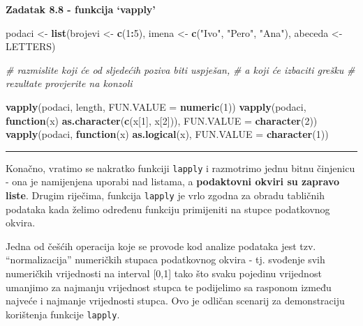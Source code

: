 \documentclass[]{book}
\newenvironment{Shaded}{\begin{snugshade}}{\end{snugshade}}
\newcommand{\KeywordTok}[1]{\textcolor[rgb]{0.13,0.29,0.53}{\textbf{#1}}}
\newcommand{\DataTypeTok}[1]{\textcolor[rgb]{0.13,0.29,0.53}{#1}}
\newcommand{\DecValTok}[1]{\textcolor[rgb]{0.00,0.00,0.81}{#1}}
\newcommand{\StringTok}[1]{\textcolor[rgb]{0.31,0.60,0.02}{#1}}
\newcommand{\CommentTok}[1]{\textcolor[rgb]{0.56,0.35,0.01}{\textit{#1}}}
\newcommand{\ControlFlowTok}[1]{\textcolor[rgb]{0.13,0.29,0.53}{\textbf{#1}}}
\newcommand{\OperatorTok}[1]{\textcolor[rgb]{0.81,0.36,0.00}{\textbf{#1}}}
\newcommand{\NormalTok}[1]{#1}
\theoremstyle{definition}
\theoremstyle{definition}
\theoremstyle{definition}
\theoremstyle{remark}
\begin{document}
\textbf{Zadatak 8.8 - funkcija `vapply'}

\begin{Shaded}
\begin{Highlighting}[]
\NormalTok{podaci <-}\StringTok{ }\KeywordTok{list}\NormalTok{(brojevi <-}\StringTok{ }\KeywordTok{c}\NormalTok{(}\DecValTok{1}\OperatorTok{:}\DecValTok{5}\NormalTok{), }
\NormalTok{               imena <-}\StringTok{ }\KeywordTok{c}\NormalTok{(}\StringTok{"Ivo"}\NormalTok{, }\StringTok{"Pero"}\NormalTok{, }\StringTok{"Ana"}\NormalTok{), }
\NormalTok{               abeceda <-}\StringTok{ }\NormalTok{LETTERS)}


\CommentTok{# razmislite koji će od sljedećih poziva biti uspješan, }
\CommentTok{# a koji će izbaciti grešku}
\CommentTok{# rezultate provjerite na konzoli}

\KeywordTok{vapply}\NormalTok{(podaci, length, }\DataTypeTok{FUN.VALUE =} \KeywordTok{numeric}\NormalTok{(}\DecValTok{1}\NormalTok{))}
\KeywordTok{vapply}\NormalTok{(podaci, }\ControlFlowTok{function}\NormalTok{(x) }\KeywordTok{as.character}\NormalTok{(}\KeywordTok{c}\NormalTok{(x[}\DecValTok{1}\NormalTok{], x[}\DecValTok{2}\NormalTok{])), }\DataTypeTok{FUN.VALUE =} \KeywordTok{character}\NormalTok{(}\DecValTok{2}\NormalTok{))}
\KeywordTok{vapply}\NormalTok{(podaci, }\ControlFlowTok{function}\NormalTok{(x) }\KeywordTok{as.logical}\NormalTok{(x), }\DataTypeTok{FUN.VALUE =} \KeywordTok{character}\NormalTok{(}\DecValTok{1}\NormalTok{))}
\end{Highlighting}
\end{Shaded}

\begin{center}\rule{0.5\linewidth}{\linethickness}\end{center}

Konačno, vratimo se nakratko funkciji \texttt{lapply} i razmotrimo jednu
bitnu činjenicu - ona je namijenjena uporabi nad listama, a
\textbf{podaktovni okviri su zapravo liste}. Drugim riječima, funkcija
\texttt{lapply} je vrlo zgodna za obradu tabličnih podataka kada želimo
određenu funkciju primijeniti na stupce podatkovnog okvira.

Jedna od češćih operacija koje se provode kod analize podataka jest tzv.
``normalizacija'' numeričkih stupaca podatkovnog okvira - tj. svođenje
svih numeričkih vrijednosti na interval {[}0,1{]} tako što svaku
pojedinu vrijednost umanjimo za najmanju vrijednost stupca te podijelimo
sa rasponom između najveće i najmanje vrijednosti stupca. Ovo je odličan
scenarij za demonstraciju korištenja funkcije \texttt{lapply}.
\end{document}
